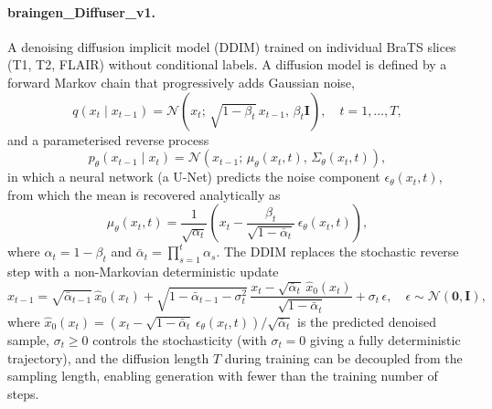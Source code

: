 \documentclass[11pt]{article}
\begin{document}
\paragraph{braingen\_Diffuser\_v1.} A denoising diffusion implicit model (DDIM)\cite{ho2020denoising,song2021maximum} trained on individual BraTS slices (T1, T2, FLAIR) without conditional labels. A diffusion model is defined by a forward Markov chain that progressively adds Gaussian noise,
\begin{equation}
q(x_{t}\mid x_{t-1}) = \mathcal{N}\!\left(x_{t};\, \sqrt{1-\beta_{t}}\, x_{t-1},\, \beta_{t} \mathbf{I}\right), \quad t=1,\dots,T,
\label{eq:diff_forward}
\end{equation}
and a parameterised reverse process
\begin{equation}
p_{\theta}(x_{t-1}\mid x_{t}) = \mathcal{N}\!\left(x_{t-1};\, \mu_{\theta}(x_{t},t),\, \Sigma_{\theta}(x_{t},t)\right),
\label{eq:diff_reverse}
\end{equation}
in which a neural network (a U-Net) predicts the noise component $\epsilon_{\theta}(x_{t},t)$, from which the mean is recovered analytically as
\begin{equation}
\mu_{\theta}(x_{t},t) = \frac{1}{\sqrt{\alpha_{t}}}\!\left(x_{t} - \frac{\beta_{t}}{\sqrt{1-\bar{\alpha}_{t}}}\, \epsilon_{\theta}(x_{t},t)\right),
\label{eq:diff_mean}
\end{equation}
where $\alpha_{t} = 1 - \beta_{t}$ and $\bar{\alpha}_{t} = \prod_{s=1}^{t} \alpha_{s}$. The DDIM\cite{song2021maximum} replaces the stochastic reverse step with a non-Markovian deterministic update
\begin{equation}
x_{t-1} = \sqrt{\bar{\alpha}_{t-1}}\, \hat{x}_{0}(x_{t}) + \sqrt{1 - \bar{\alpha}_{t-1} - \sigma_{t}^{2}}\, \frac{x_{t} - \sqrt{\bar{\alpha}_{t}}\, \hat{x}_{0}(x_{t})}{\sqrt{1 - \bar{\alpha}_{t}}} + \sigma_{t}\, \epsilon, \quad \epsilon\sim\mathcal{N}(\mathbf{0},\mathbf{I}),
\label{eq:ddim}
\end{equation}
where $\hat{x}_{0}(x_{t}) = \left(x_{t} - \sqrt{1-\bar{\alpha}_{t}}\, \epsilon_{\theta}(x_{t},t)\right)/\sqrt{\bar{\alpha}_{t}}$ is the predicted denoised sample, $\sigma_{t} \geq 0$ controls the stochasticity (with $\sigma_{t}=0$ giving a fully deterministic trajectory), and the diffusion length $T$ during training can be decoupled from the sampling length, enabling generation with fewer than the training number of steps.
\end{document}
